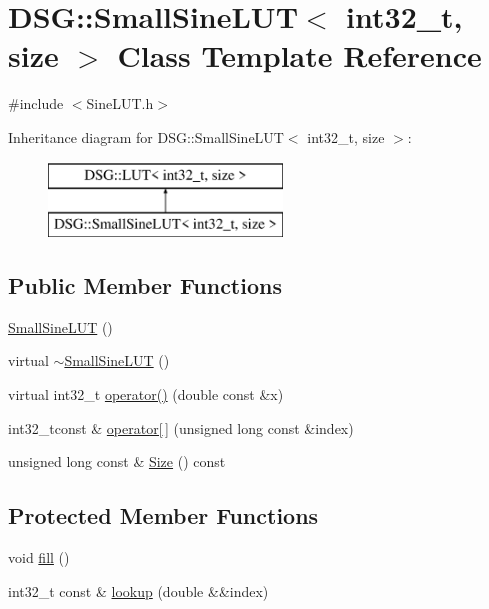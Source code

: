 \hypertarget{classDSG_1_1SmallSineLUT_3_01int32__t_00_01size_01_4}{\section{D\+S\+G\+:\+:Small\+Sine\+L\+U\+T$<$ int32\+\_\+t, size $>$ Class Template Reference}
\label{classDSG_1_1SmallSineLUT_3_01int32__t_00_01size_01_4}
}


{\ttfamily \#include $<$Sine\+L\+U\+T.\+h$>$}

Inheritance diagram for D\+S\+G\+:\+:Small\+Sine\+L\+U\+T$<$ int32\+\_\+t, size $>$\+:\begin{figure}[H]
\begin{center}
\leavevmode
\includegraphics[height=2.000000cm]{classDSG_1_1SmallSineLUT_3_01int32__t_00_01size_01_4}
\end{center}
\end{figure}
\subsection*{Public Member Functions}
\begin{DoxyCompactItemize}
\item 
\hyperlink{classDSG_1_1SmallSineLUT_3_01int32__t_00_01size_01_4_a6acdadec2af6be4855af1be148b7d79a}{Small\+Sine\+L\+U\+T} ()
\item 
virtual \hyperlink{classDSG_1_1SmallSineLUT_3_01int32__t_00_01size_01_4_acc7a4dff97acc2c1e85c11af41e65127}{$\sim$\+Small\+Sine\+L\+U\+T} ()
\item 
virtual int32\+\_\+t \hyperlink{classDSG_1_1SmallSineLUT_3_01int32__t_00_01size_01_4_a63873dafa3ddb5c6c36fa2c2c1ab5bf7}{operator()} (double const \&x)
\item 
int32\+\_\+tconst \& \hyperlink{classDSG_1_1LUT_a5f3bc252bd650fae13046e7959b94f81}{operator\mbox{[}$\,$\mbox{]}} (unsigned long const \&index)
\item 
unsigned long const \& \hyperlink{classDSG_1_1LUT_a2d1a2112f9e960c7b70882a19d670ff9}{Size} () const
\end{DoxyCompactItemize}
\subsection*{Protected Member Functions}
\begin{DoxyCompactItemize}
\item 
void \hyperlink{classDSG_1_1SmallSineLUT_3_01int32__t_00_01size_01_4_a5f08d4c634a95d05edb6dec411df4270}{fill} ()
\item 
int32\+\_\+t const \& \hyperlink{classDSG_1_1SmallSineLUT_3_01int32__t_00_01size_01_4_ab2ba369359e94c52febf2dbff7abdc67}{lookup} (double \&\&index)
\end{DoxyCompactItemize}
